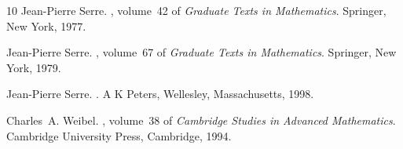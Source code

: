 \begin{thebibliography}{10}
Jean-Pierre Serre.
, volume~42 of {\em
  Graduate Texts in Mathematics}.
\newblock Springer, New York, 1977.

Jean-Pierre Serre.
, volume~67 of {\em Graduate Texts in Mathematics}.
\newblock Springer, New York, 1979.

Jean-Pierre Serre.
.
\newblock A K Peters, Wellesley, Massachusetts, 1998.

Charles~A. Weibel.
, volume~38 of {\em
  Cambridge Studies in Advanced Mathematics}.
\newblock Cambridge University Press, Cambridge, 1994.

\end{thebibliography}
